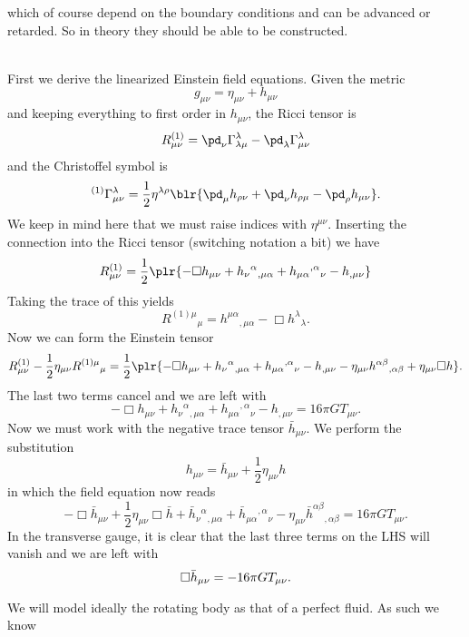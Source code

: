 \documentclass[10pt,letterpaper]{article}
\begin{document}
which of course depend on the boundary conditions and can be advanced or retarded. So in theory they should be able to be constructed.\\ \\
\item
 First we derive the linearized Einstein field equations. Given the metric
 \[
 	g_{\mu\nu} = \eta_{\mu\nu} + h_{\mu\nu}
\]
and keeping everything to first order in $h_{\mu\nu}$, the Ricci tensor is
\[
	R_{\mu\nu}^{(1)} = \pd_\nu \Gamma^\lambda_{\lambda\mu} - \pd_\lambda \Gamma^\lambda_{\mu\nu}
\]
and the Christoffel symbol is
\[
	{}^{(1)}\Gamma^\lambda_{\mu\nu} = \frac12 \eta^{\lambda\rho}\blr{
	\pd_\mu h_{\rho\nu} + \pd_\nu h_{\rho\mu} - \pd_\rho h_{\mu\nu}}.
\]
We keep in mind here that we must raise indices with $\eta^{\mu\nu}$. Inserting the connection into the Ricci tensor (switching notation a bit) we have
\[
	R_{\mu\nu}^{(1)} = \frac12\plr{ -\Box h_{\mu\nu} + h_\nu{}^{\alpha}{}_{,\mu\alpha} + h_{\mu\alpha}{}^{,\alpha}{}_{\nu} - h_{,\mu\nu}}
\]
Taking the trace of this yields
\[
	R^{(1)\mu}{}_\mu = h^{\mu\alpha}{}_{,\mu\alpha} - \Box h^\lambda{}_\lambda.
\]
Now we can form the Einstein tensor
\[
	R_{\mu\nu}^{(1)}-\frac12\eta_{\mu\nu}R^{(1)\mu}{}_\mu = \frac12\plr{ 
	 -\Box h_{\mu\nu} + h_\nu{}^{\alpha}{}_{,\mu\alpha} + h_{\mu\alpha}{}^{,\alpha}{}_{\nu} - h_{,\mu\nu} 
	 -\eta_{\mu\nu}h^{\alpha\beta}{}_{,\alpha\beta} + \eta_{\mu\nu}\Box h}.
\]
The last two terms cancel and we are left with
\[
	 -\Box h_{\mu\nu} + h_\nu{}^{\alpha}{}_{,\mu\alpha} + h_{\mu\alpha}{}^{,\alpha}{}_{\nu} - h_{,\mu\nu} = 16\pi G T_{\mu\nu}.
\]
Now we must work with the negative trace tensor $\bar h_{\mu\nu}$. We perform the substitution
\[
	h_{\mu\nu} = \bar h_{\mu\nu}+\frac12 \eta_{\mu\nu} h
\]
in which the field equation now reads
\[
	-\Box \bar h_{\mu\nu} +\frac12 \eta_{\mu\nu}\Box \bar h + \bar h_{\nu}{}^\alpha{}_{,\mu\alpha} + \bar h_{\mu\alpha}{}^{,\alpha}{}_{\nu} - 
	\eta_{\mu\nu}\bar h^{\alpha\beta}{}_{,\alpha\beta} = 16\pi G T_{\mu\nu}.
\]
In the transverse gauge, it is clear that the last three terms on the LHS will vanish and we are left with
\[
	\Box \bar h_{\mu\nu} = -16 \pi G T_{\mu\nu}. \\ \\
\]
\eenum 
\item
\benum
\item
We will model ideally the rotating body as that of a perfect fluid. As such we know
\end{document}

